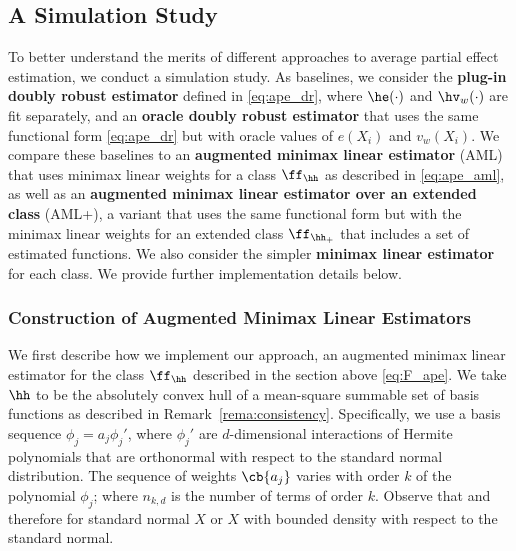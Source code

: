 \documentclass[aos,submission]{imsart}
\theoremstyle{plain}
\theoremstyle{remark}
\begin{document}
\subsection{A Simulation Study}
\label{sec:simu}

To better understand the merits of different approaches to average partial effect estimation, we
conduct a simulation study. 
As baselines, we consider the {\bf plug-in doubly robust estimator} defined in \eqref{eq:ape_dr}, 
where $\he(\cdot)$ and $\hv_w(\cdot)$ are fit separately,
and an {\bf oracle doubly robust estimator} that uses the same
functional form \eqref{eq:ape_dr} but with oracle values of $e(X_i)$ and $v_w(X_i)$.
We compare these baselines to an {\bf augmented minimax linear estimator} (AML) 
that uses minimax linear weights for a class $\ff_{\hh}$ as described in \eqref{eq:ape_aml}, as well as an 
{\bf augmented minimax linear estimator over an extended class} (AML+), a variant 
that uses the same functional form but with the minimax linear weights for an extended class $\ff_{\hh_+}$
that includes a set of estimated functions. We also consider the simpler {\bf minimax linear estimator}
for each class. We provide further implementation details below.



\subsubsection{Construction of Augmented Minimax Linear Estimators}

We first describe how we implement our approach,
an augmented minimax linear estimator for the class $\ff_{\hh}$ described in the section above \eqref{eq:F_ape}.
We take $\hh$ to be the absolutely convex hull of a mean-square summable set of basis functions as described in Remark~\ref{rema:consistency}.
Specifically, we use a basis sequence $\phi_j=a_j\phi_j'$, where $\phi_j'$ are $d$-dimensional
interactions of Hermite polynomials that are orthonormal with respect to the standard normal
distribution. The sequence of weights $\cb{a_j}$ varies with order $k$ of the polynomial $\phi_j$;
 where $n_{k,d}$ is the number of terms of order $k$.
Observe that   and therefore  for standard normal $X$ or $X$ with bounded density with respect to the standard normal.
\end{document}
